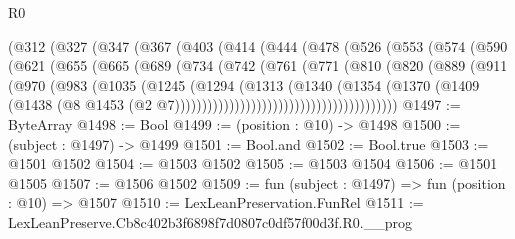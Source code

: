 \begin{lexlean}{R0}
\begin{coremodule}
            (@312
              (@327
                (@347
                  (@367
                    (@403
                      (@414
                        (@444
                          (@478
                            (@526
                              (@553
                                (@574
                                  (@590
                                    (@621
                                      (@655
                                        (@665
                                          (@689
                                            (@734
                                              (@742
                                                (@761
                                                  (@771
                                                    (@810
                                                      (@820
                                                        (@889
                                                          (@911
                                                            (@970
                                                              (@983
                                                                (@1035
                                                                  (@1245
                                                                    (@1294
                                                                      (@1313
                                                                        (@1340
                                                                          (@1354
                                                                            (@1370
                                                                              (@1409
                                                                                (@1438
                                                                                  (@8
                                                                                    @1453
                                                                                    (@2
                                                                                      @7)))))))))))))))))))))))))))))))))))))))))
@1497 := ByteArray
@1498 := Bool
@1499 := (position : @10) -> @1498
@1500 := (subject : @1497) -> @1499
@1501 := Bool.and
@1502 := Bool.true
@1503 := @1501 @1502
@1504 := @1503 @1502
@1505 := @1503 @1504
@1506 := @1501 @1505
@1507 := @1506 @1502
@1509 := fun (subject : @1497) => fun (position : @10) => @1507
@1510 := LexLeanPreservation.FunRel
@1511 := LexLeanPreserve.Cb8c402b3f6898f7d0807c0df57f00d3f.R0.__prog

\end{coremodule}
\end{lexlean}
